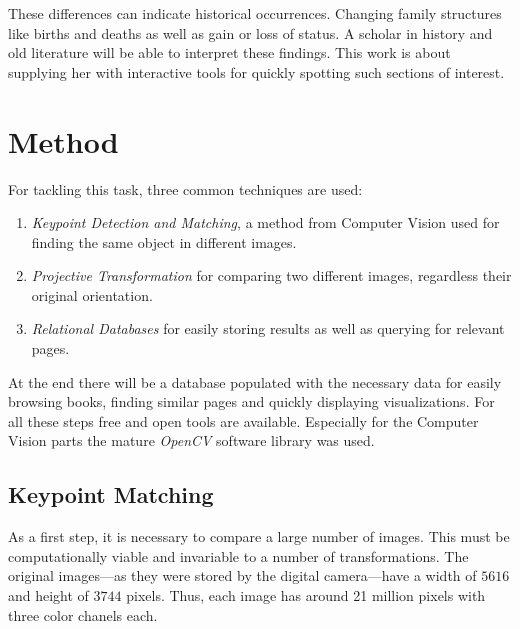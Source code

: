 \documentclass{ltjarticle}
\begin{document}
These differences can indicate historical occurrences. Changing family structures like births and deaths as well as gain or loss of status. A scholar in history and old literature will be able to interpret these findings. This work is about supplying her with interactive tools for quickly spotting such sections of interest.

\section{Method}

For tackling this task, three common techniques are used:

\begin{enumerate}
    \item \emph{Keypoint Detection and Matching}, a method from Computer Vision used for finding the same object in different images.
    \item \emph{Projective Transformation} for comparing two different images, regardless their original orientation.
    \item \emph{Relational Databases} for easily storing results as well as querying for relevant pages.
\end{enumerate}

At the end there will be a database populated with the necessary data for easily browsing books, finding similar pages and quickly displaying visualizations. For all these steps free and open tools are available. Especially for the Computer Vision parts the mature \emph{OpenCV} software library was used.\cite{opencv_library}

\subsection{Keypoint Matching}
\label{sec:keypoint-matching}

As a first step, it is necessary to compare a large number of images. This must be computationally viable and invariable to a number of transformations. The original images---as they were stored by the digital camera---have a width of $5616$ and height of $3744$ pixels. Thus, each image has around 21 million pixels with three color chanels each.
\end{document}
